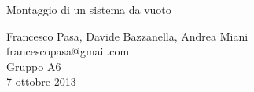 \begin{center}

     	{\huge Montaggio di un sistema da vuoto}
	\vspace{0.3cm}

      	{\large Francesco Pasa, Davide Bazzanella, Andrea Miani} \\
      	{francescopasa@gmail.com} \\
		{\large Gruppo A6} \\
	
	\vspace{0.2cm}
      	{\large 7 ottobre 2013}
\end{center}
